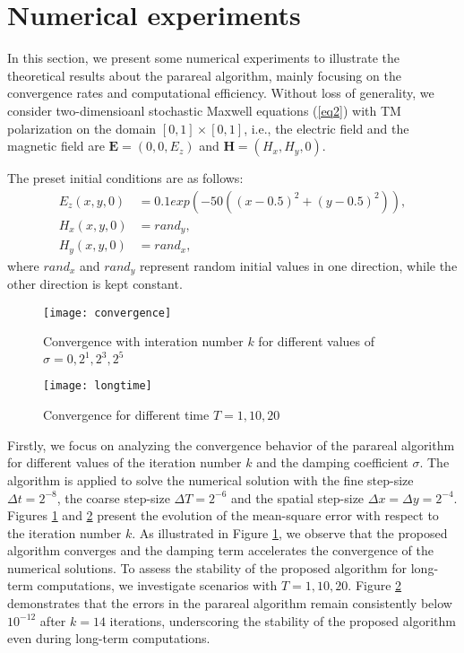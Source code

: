 \documentclass[preprint,12pt]{elsarticle}
\begin{document}
\section{Numerical experiments}\label{sec7}
In this section, we present some numerical experiments to illustrate the theoretical results about the parareal algorithm, mainly focusing on the convergence rates and computational efficiency. Without loss of generality, we consider two-dimensioanl stochastic Maxwell equations (\ref{eq2}) with TM polarization on the domain $[0,1]\times[0,1]$, i.e., the electric field and the magnetic field are $\bm{E}=(0,0,E_{z})$ and $\bm{H}=(H_{x},H_{y},0)$.

The preset initial conditions are as follows:
\begin{align*}
	E_{z}(x,y,0)&=0.1exp(-50((x-0.5)^2+(y-0.5)^2)),\\
	H_{x}(x,y,0)&=rand_{y},\\
	H_{y}(x,y,0)&=rand_{x},
\end{align*}
where  $rand_{x}$ and $rand_{y}$ represent random initial values in one direction, while the other direction is kept constant. 

\begin{figure}[htbp]
	\centerline{\texttt{[image: convergence]}}
	\vspace*{8pt}
	\caption{Convergence with interation number $k$ for different values of $\sigma=0,2^1,2^3,2^5$}
	\label{fig1}
\end{figure}

\begin{figure}[htbp]
	\centerline{\texttt{[image: longtime]}}
	\vspace*{8pt}
	\caption{Convergence for different time $T=1,10,20$}
	\label{fig2}
\end{figure}

Firstly, we focus on analyzing the convergence behavior of the parareal algorithm for different values of the iteration number $k$ and the damping coefficient $\sigma$. The algorithm is applied to solve the numerical solution with the fine step-size $\Delta t = 2^{-8}$, the coarse step-size $\Delta T = 2^{-6}$ and the spatial step-size $\Delta x = \Delta y = 2^{-4}$.  Figures \ref{fig1} and \ref{fig2} present the evolution of the mean-square error  with respect to the iteration number $k$. As illustrated in Figure \ref{fig1}, we observe that the proposed algorithm converges and the damping term accelerates the convergence of the numerical solutions. To assess the stability of the proposed algorithm for long-term computations, we investigate scenarios with  $T = 1, 10, 20$. Figure \ref{fig2} demonstrates that the errors in the parareal algorithm remain consistently below \( 10^{-12} \) after \( k = 14 \) iterations, underscoring the stability of the proposed algorithm even during long-term computations.
\end{document}
